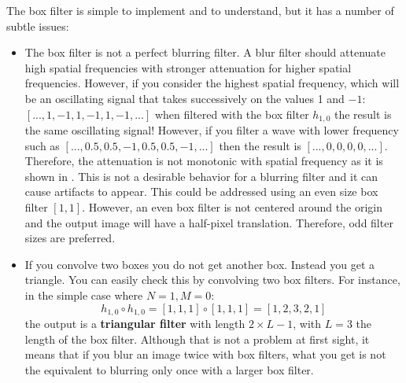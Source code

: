 The box filter is simple to implement and to understand, but it has a number of subtle issues:
\begin{itemize}
	\item {The box filter is not a perfect blurring filter. A blur filter should attenuate high spatial frequencies with stronger attenuation for higher spatial frequencies. However, if you consider the highest spatial frequency, which will be an oscillating signal that takes successively on the values 1 and $-1$: $\left[..., 1, -1, 1, -1, 1, -1, ... \right]$ when filtered with the box filter $h_{1,0}$ the result is the same oscillating signal! However, if you filter a wave with lower frequency such as $\left[..., 0.5, 0.5, -1, 0.5, 0.5, -1, ... \right]$ then the result is $\left[..., 0,0,0,0, ...\right]$. Therefore, the attenuation is not monotonic with spatial frequency as it is shown in \fig{\ref{fig:boxfilter}}. This is not a desirable behavior for a blurring filter and it can cause artifacts to appear. This could be addressed using an even size box filter $\left[1,1 \right]$. However, an even box filter is not centered around the origin and the output image will have a half-pixel translation. Therefore, odd filter sizes are preferred.}

	\item {If you convolve two boxes you do not get another box. Instead you get a triangle. You can easily check this by convolving two box filters. For instance, in the simple case where $N=1, M=0$:
	      \begin{equation}
		      h_{1,0} \circ h_{1,0} = \left[1, 1, 1\right] \circ \left[1, 1, 1\right] = \left[1,2,3,2,1\right]
	      \end{equation}
	      the output  is a {\bf triangular filter}
	      with length $2\times L-1$, with $L=3$ the length of the box filter. Although that is not a problem at first sight, it means that if you blur an image twice with box filters, what you get is not the equivalent to blurring only once with a larger box filter.}
\end{itemize}


